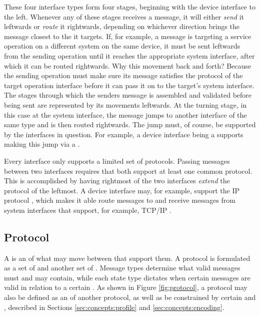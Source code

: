 These four interface types form four stages, beginning with the device interface to the left.
Whenever any of these stages receives a message, it will either \textit{send} it leftwards or \textit{route} it rightwards, depending on whichever direction brings the message closest to the  it targets.
If, for example, a message is targeting a service operation on a different system on the same device, it must be sent leftwards from the sending operation until it reaches the appropriate system interface, after which it can be routed rightwards.
Why this movement back and forth?
Because the sending operation must make sure its message satisfies the protocol of the target operation interface before it can pass it on to the target's system interface.
The stages through which the senders message is assembled and validated before being sent are represented by its movements leftwards.
At the turning stage, in this case at the system interface, the message jumps to another interface of the same type and is then routed rightwards.
The jump must, of course, be supported by the interfaces in question.
For example, a device interface being a  supports making this jump via a .

Every interface only supports a limited set of protocols.
Passing messages between two interfaces requires that both support at least one common protocol.
This is accomplished by having rightmost of the two interfaces \textit{extend} the protocol of the leftmost.
A device interface may, for example, support the IP protocol \cite{deering2017internet}, which makes it able route messages to and receive messages from system interfaces that support, for example, TCP/IP \cite{postel1981transmission}.

\subsection{Protocol}
\label{sec:concepts:protocol}

A  is an   of what  may move between  that support them.
A protocol is formulated as a set of  and another set of .
Message types determine what  valid messages must and may contain, while each state type dictates when certain messages are valid in relation to a certain .
As shown in Figure \ref{fig:protocol}, a protocol may also be defined as an  of another protocol, as well as be constrained by certain  and , described in Sections \ref{sec:concepts:profile} and \ref{sec:concepts:encoding}.

